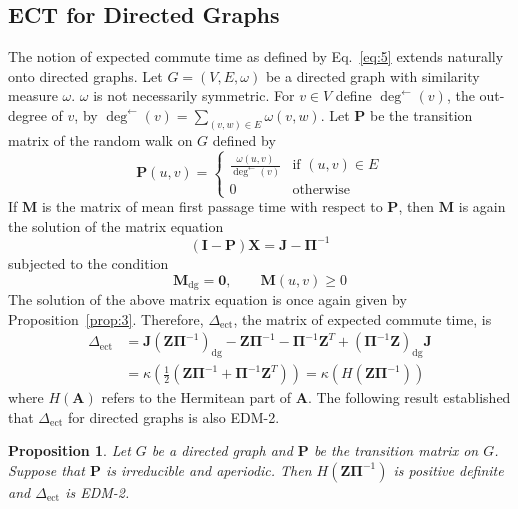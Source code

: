 \documentclass[10pt,twocolumn]{article}
\newtheorem{proposition}[theorem]{Proposition}
\numberwithin{equation}{section}
\begin{document}
\subsection{ECT for Directed Graphs}
\label{sec:ect-directed-graphs}
The notion of expected commute time as defined by Eq.~\eqref{eq:5}
extends naturally onto directed graphs. Let $G = (V,E,\omega)$ be a
directed graph with similarity measure $\omega$. $\omega$ is not
necessarily symmetric. For $v \in V$ define $\deg^{\leftarrow }(v)$,
the out-degree of $v$, by $\deg^{\leftarrow }(v) = \sum_{(v,w) \in
  E}{\omega(v,w)}$. Let $\mathbf{P}$ be the transition matrix of the
random walk on $G$ defined by
\begin{equation}
  \label{eq:26}
  \mathbf{P}(u,v) = \begin{cases}
    \tfrac{\omega(u,v)}{\deg^{\leftarrow }(v)} & \text{if $(u,v) \in E$} \\
    0 & \text{otherwise}
  \end{cases}
\end{equation}
If $\mathbf{M}$ is the matrix of mean first passage time with respect
to $\mathbf{P}$, then $\mathbf{M}$ is again the solution of the matrix equation
\begin{equation*}
   (\mathbf{I} - \mathbf{P})\mathbf{X} = \mathbf{J} - \bm{\Pi}^{-1}
\end{equation*}
subjected to the condition 
\begin{equation*}
 \mathbf{M}_{\mathrm{dg}} = \mathbf{0}, \qquad \mathbf{M}(u,v) \geq 0   
\end{equation*}
The solution of the above matrix equation is once again given by
Proposition~\ref{prop:3}. Therefore, $\Delta_{\mathrm{ect}}$, the matrix of expected
commute time, is 
\begin{equation}
  \label{eq:27}
  \begin{split}
    \Delta_{\mathrm{ect}} &= \mathbf{J}(\mathbf{Z}\bm{\Pi}^{-1})_{\mathrm{dg}}
    - \mathbf{Z}\bm{\Pi}^{-1} - \bm{\Pi}^{-1}\mathbf{Z}^{T} +
    (\bm{\Pi}^{-1}\mathbf{Z})_{\mathrm{dg}}\mathbf{J} \\ \ &=
    \kappa(\tfrac{1}{2}(\mathbf{Z}\bm{\Pi}^{-1} +
    \mathbf{\Pi}^{-1}\mathbf{Z}^{T})) =
    \kappa(H(\mathbf{Z}\bm{\Pi}^{-1}))
  \end{split}
\end{equation}
where $H(\mathbf{A})$ refers to the Hermitean part of $\mathbf{A}$.
The following result established that $\Delta_{\mathrm{ect}}$ for directed
graphs is also EDM-2. 
\begin{proposition}
  \label{prop:10}
  Let $G$ be a directed graph and $\mathbf{P}$ be the transition
  matrix on $G$. Suppose that $\mathbf{P}$ is irreducible and
  aperiodic. Then $H(\mathbf{Z}\bm{\Pi}^{-1})$ is positive
  definite and $\Delta_{\mathrm{ect}}$ is EDM-2.
\end{proposition}
\end{document}
